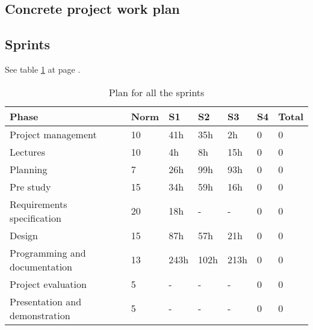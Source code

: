

\subsection{Concrete project work plan}

\subsection*{Sprints}
See table \ref{tab:allsprints} at page \pageref{tab:allsprints}.
\begin{table}
\begin{tabular}{l|l|l|l|l|l|l}
\textbf{Phase} &  \textbf{Norm} & \textbf{S1} & \textbf{S2}  & \textbf{S3} & \textbf{S4} & \textbf{Total} \\ \hline \hline
Project management & 10 & 41h & 35h & 2h & 0 & 0\\ \hline
Lectures & 10 & 4h & 8h & 15h & 0 & 0\\ \hline
Planning & 7 & 26h & 99h & 93h & 0 & 0\\ \hline
Pre study & 15 & 34h & 59h & 16h & 0 & 0\\ \hline
Requirements specification & 20 & 18h & - & - & 0 & 0\\ \hline
Design & 15 & 87h & 57h & 21h & 0 & 0\\ \hline
Programming and documentation & 13 & 243h & 102h & 213h & 0 & 0\\ \hline
Project evaluation & 5 & - & - & - & 0 & 0\\ \hline
Presentation and demonstration & 5 & - & - & - & 0 & 0
\end{tabular}
\caption{Plan for all the sprints} \label{tab:allsprints}
\end{table}


